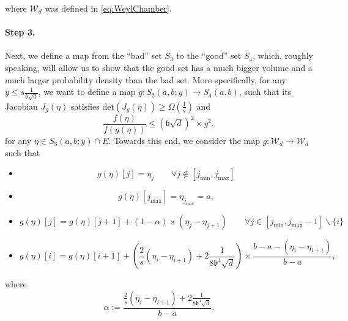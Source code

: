 \documentclass[11pt,letterpaper]{article}
\begin{document}
%
 where $\mathcal{W}_d$ was defined in \eqref{eq:WeylChamber}.
%


\paragraph{Step 3.} Next, we define a map from the ``bad'' set $S_3$ to the ``good'' set $S_4$, which, roughly speaking, will allow us to show that the good set has a much bigger volume and a much larger probability density than the bad set.
%
  More specifically, for any $y \leq s\frac{1}{\mathfrak{b}\sqrt{d}}$, we want to define a map $g:   S_2(a,b;y) \rightarrow S_4(a,b)$, such that its Jacobian $J_g(\eta)$ satisfies $\mathrm{det}(J_g(\eta)) \geq \Omega(\frac{1}{s})$ and 
%
\begin{equation}\label{eq_b3}
    \frac{f(\eta)}{f(g(\eta))} \leq (\mathfrak{b} \sqrt{d} )^2 \times y^2,
    \end{equation}
  for any $\eta \in  S_3(a,b;y) \cap E$.
  Towards this end, we consider the map $g:  \mathcal{W}_d \rightarrow \mathcal{W}_d$ such that 

  \begin{itemize}
  
  \item 
\begin{equation}\label{eq_g3}
      g(\eta)[j] = \eta_j \qquad \forall j \notin [j_{\mathrm{min}}, j_{\mathrm{max}}]
      \end{equation}
  
  \item 
\begin{equation}\label{eq_g4}
      g(\eta)[j_{\mathrm{max}}] = \eta_{j_{\mathrm{max}}} = a,
      \end{equation}

   
\item   
%
\begin{equation}\label{eq_g2}
    g(\eta)[j] = g(\eta)[j+1] + (1-\alpha) \times (\eta_j - \eta_{j+1}) \qquad \forall j \in[j_{\mathrm{min}}, j_{\mathrm{max}} -1]\backslash \{i\}
\end{equation}
  
  \item  
  \begin{equation}\label{eq_g1}
  g(\eta)[i] = g(\eta)[i+1] + \left(\frac{2}{s}(\eta_{i}- \eta_{i+1})+ 2\frac{1}{8\mathfrak{b}^4\sqrt{d}}\right) \times \frac{b-a -(\eta_{i}- \eta_{i+1})}{b-a},
  \end{equation}
\end{itemize}
where 
%
\begin{equation}\label{eq_n20}
\alpha := \frac{ \frac{2}{s}(\eta_{i}- \eta_{i+1}) +2\frac{1}{8\mathfrak{b}^4\sqrt{d}} }{b-a}.
\end{equation}
%
\end{document}
